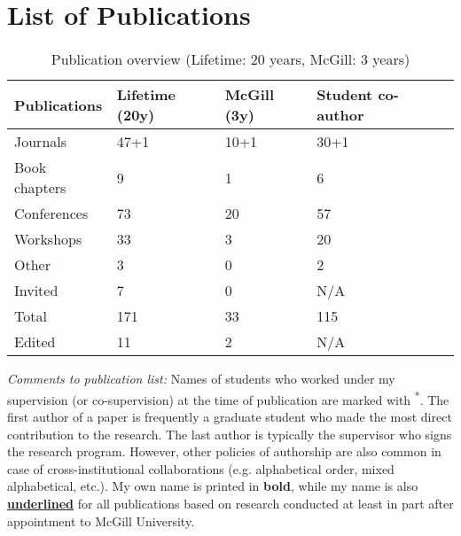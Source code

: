\section{List of Publications}


\begin{table}[htb]
\begin{tabular}{@{}lllll@{}}
\toprule
\textbf{Publications} & \textbf{Lifetime} (20y) & \textbf{McGill} (3y) & \textbf{Student co-author} \\ \midrule
Journals & 47+1 & 10+1 & 30+1 \\ %
Book chapters & 9 & 1 & 6  \\ %
Conferences & 73 & 20 & 57  \\ %
Workshops & 33 & 3 & 20  \\ %
Other & 3 & 0 & 2  \\ %
Invited & 7 & 0 & N/A   \\ \midrule
Total & 171 & 33 & 115 \\ \midrule
Edited & 11 & 2 & N/A \\ %
\bottomrule
\end{tabular}
\caption{Publication overview (Lifetime: 20 years, McGill: 3 years)}
\label{tab:publication-overview}
\end{table}


\emph{Comments to publication list:} Names of students who worked under my supervision (or co-supervision) at the time of publication are marked with \textsuperscript{*}. The first author of a paper is frequently a graduate student who made the most direct contribution to the research. The last author is typically the supervisor who signs the research program. However, other policies of authorship are also common in case of cross-institutional collaborations (e.g. alphabetical order, mixed alphabetical, etc.). My own name is printed in \textbf{bold}, while my name is also \textbf{\underline{underlined}} for all 
publications based on research conducted at least in part after appointment to McGill University.

\nocite{fmi2004,nagl65-2010,bpel2sal-sensoria-book,sensoria-uml,SENSORIABook:AdvancesInGT,%
mdegt2005-ggzvvv,caise2011-revised,fmic2005-pv,fmhe2018}

